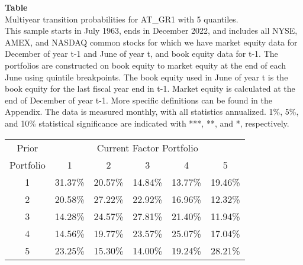 \begin{table*}[ht!]
\raggedright
{}
\label{tab: multiyear_transition_probs_AT_GR1_with_5_quantiles}
\textbf{Table \thetable} \\
Multiyear transition probabilities for AT_GR1 with 5 quantiles. \\
\hspace*{1em}This sample starts in July 1963, ends in December 2022, and includes all NYSE, AMEX, and NASDAQ common stocks for which we have market equity data for December of year t-1 and June of year t, and book equity data for t-1. The portfolios are constructed on book equity to market equity at the end of each June using quintile breakpoints.  The book equity used in June of year t is the book equity for the last fiscal year end in t-1.  Market equity is calculated at the end of December of year t-1.  More specific definitions can be found in the Appendix.  The data is measured monthly, with all statistics annualized.  1\%, 5\%, and 10\% statistical significance are indicated with ***, **, and *, respectively. \\
\vspace{0.5em}
\centering
\begin{adjustbox}{max width=\textwidth}
\begin{tabular}{@{}cccccc@{}}
\toprule
Prior & \multicolumn{5}{c}{Current Factor Portfolio} \\
Portfolio & 1 & 2 & 3 & 4 & 5 \\
\midrule
1 & 31.37\% & 20.57\% & 14.84\% & 13.77\% & 19.46\% \\
2 & 20.58\% & 27.22\% & 22.92\% & 16.96\% & 12.32\% \\
3 & 14.28\% & 24.57\% & 27.81\% & 21.40\% & 11.94\% \\
4 & 14.56\% & 19.77\% & 23.57\% & 25.07\% & 17.04\% \\
5 & 23.25\% & 15.30\% & 14.00\% & 19.24\% & 28.21\% \\
\bottomrule
\end{tabular}
\end{adjustbox}
\end{table*}